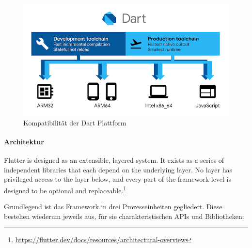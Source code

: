\begin{figure}[h]
	\begin{center}
		\includegraphics[scale=0.45]{Theoretische_Grundlagen/images/dart-diagram.png}
	\end{center}
	\caption{Kompatibilität der Dart Plattform \protect \footnotemark}
	\label{fig:dart_plattform}
\end{figure}

\paragraph{Architektur}
\begin{displayquote}
	Flutter is designed as an extensible, layered system. It exists as a series of independent libraries that each depend on the underlying layer. No layer has privileged access to the layer below, and every part of the framework level is designed to be optional and replaceable.\footnote{\url{https://flutter.dev/docs/resources/architectural-overview}}
\end{displayquote}

Grundlegend ist das Framework in drei Prozesseinheiten gegliedert. Diese bestehen wiederum jeweils aus, für sie charakteristischen APIs und Bibliotheken:

